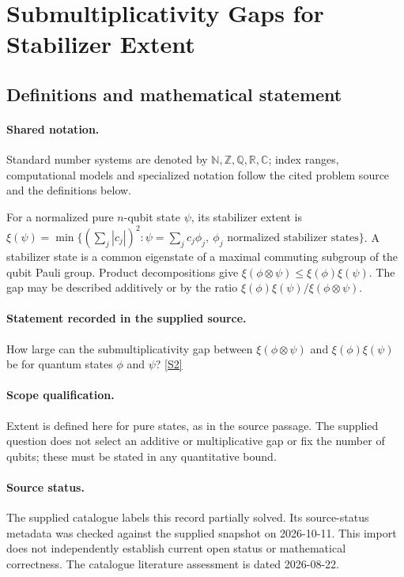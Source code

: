 \documentclass[11pt]{article}
\newcommand{\sref}[2]{\hyperlink{source:#1:#2}{[S#2]}}
\begin{document}
\section{Submultiplicativity Gaps for Stabilizer Extent}\label{statement}

\subsection{Definitions and mathematical statement}

\paragraph{Shared notation.}Standard number systems are denoted by $\mathbb N,\mathbb Z,\mathbb Q,\mathbb R,\mathbb C$; index ranges, computational models and specialized notation follow the cited problem source and the definitions below.


For a normalized pure $n$-qubit state $\psi$, its stabilizer extent is $\xi(\psi)=\min\{(\sum_j|c_j|)^2:\psi=\sum_jc_j\phi_j,\ \phi_j\text{ normalized stabilizer states}\}$. A stabilizer state is a common eigenstate of a maximal commuting subgroup of the qubit Pauli group. Product decompositions give $\xi(\phi\otimes\psi)\leq\xi(\phi)\xi(\psi)$. The gap may be described additively or by the ratio $\xi(\phi)\xi(\psi)/\xi(\phi\otimes\psi)$.
\paragraph{Statement recorded in the supplied source.}
How large can the submultiplicativity gap between $\xi(\phi\otimes\psi)$ and $\xi(\phi)\xi(\psi)$ be for quantum states $\phi$ and $\psi$? \sref{statement}{2}
\paragraph{Scope qualification.}
Extent is defined here for pure states, as in the source passage. The supplied question does not select an additive or multiplicative gap or fix the number of qubits; these must be stated in any quantitative bound.
\paragraph{Source status.}
The supplied catalogue labels this record partially solved. Its source-status metadata was checked against the supplied snapshot on 2026-10-11. This import does not independently establish current open status or mathematical correctness. The catalogue literature assessment is dated 2026-08-22.
\end{document}

